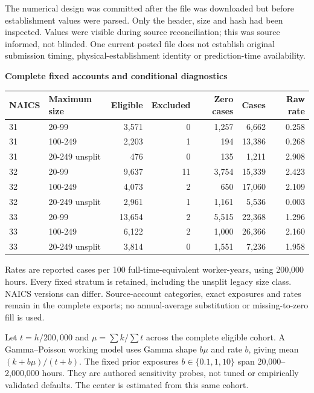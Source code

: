 \documentclass[11pt,letterpaper]{article}
\newcommand{\heading}[1]{\vspace{4pt}{\large\bfseries #1}\par}
\newcommand{\BoundJ}{3,571}
\newcommand{\BoundK}{0}
\newcommand{\BoundL}{1,257}
\newcommand{\BoundM}{6,662}
\newcommand{\BoundN}{0.258}
\newcommand{\BoundO}{2,203}
\newcommand{\BoundP}{1}
\newcommand{\BoundQ}{194}
\newcommand{\BoundR}{13,386}
\newcommand{\BoundS}{0.268}
\newcommand{\BoundT}{476}
\newcommand{\BoundU}{0}
\newcommand{\BoundV}{135}
\newcommand{\BoundW}{1,211}
\newcommand{\BoundX}{2.908}
\newcommand{\BoundY}{9,637}
\newcommand{\BoundZ}{11}
\newcommand{\BoundAA}{3,754}
\newcommand{\BoundAB}{15,339}
\newcommand{\BoundAC}{2.423}
\newcommand{\BoundAD}{4,073}
\newcommand{\BoundAE}{2}
\newcommand{\BoundAF}{650}
\newcommand{\BoundAG}{17,060}
\newcommand{\BoundAH}{2.109}
\newcommand{\BoundAI}{2,961}
\newcommand{\BoundAJ}{1}
\newcommand{\BoundAK}{1,161}
\newcommand{\BoundAL}{5,536}
\newcommand{\BoundAM}{0.003}
\newcommand{\BoundAN}{13,654}
\newcommand{\BoundAO}{2}
\newcommand{\BoundAP}{5,515}
\newcommand{\BoundAQ}{22,368}
\newcommand{\BoundAR}{1.296}
\newcommand{\BoundAS}{6,122}
\newcommand{\BoundAT}{2}
\newcommand{\BoundAU}{1,000}
\newcommand{\BoundAV}{26,366}
\newcommand{\BoundAW}{2.160}
\newcommand{\BoundAX}{3,814}
\newcommand{\BoundAY}{0}
\newcommand{\BoundAZ}{1,551}
\newcommand{\BoundBA}{7,236}
\newcommand{\BoundBB}{1.958}
\begin{document}
The numerical design was committed after the file was downloaded but before establishment values were parsed. Only the header, size and hash had been inspected. Values were visible during source reconciliation; this was source informed, not blinded. One current posted file does not establish original submission timing, physical-establishment identity or prediction-time availability.
\newpage
{\Large\bfseries Complete fixed accounts and conditional diagnostics\par}
{\small\setlength{\tabcolsep}{5pt}
\begin{tabular}{@{}llrrrrr@{}}\toprule
NAICS & Maximum size & Eligible & Excluded & Zero cases & Cases & Raw rate\\\midrule
31 & 20-99 & \BoundJ{} & \BoundK{} & \BoundL{} & \BoundM{} & \BoundN{} \\
31 & 100-249 & \BoundO{} & \BoundP{} & \BoundQ{} & \BoundR{} & \BoundS{} \\
31 & 20-249 unsplit & \BoundT{} & \BoundU{} & \BoundV{} & \BoundW{} & \BoundX{} \\
32 & 20-99 & \BoundY{} & \BoundZ{} & \BoundAA{} & \BoundAB{} & \BoundAC{} \\
32 & 100-249 & \BoundAD{} & \BoundAE{} & \BoundAF{} & \BoundAG{} & \BoundAH{} \\
32 & 20-249 unsplit & \BoundAI{} & \BoundAJ{} & \BoundAK{} & \BoundAL{} & \BoundAM{} \\
33 & 20-99 & \BoundAN{} & \BoundAO{} & \BoundAP{} & \BoundAQ{} & \BoundAR{} \\
33 & 100-249 & \BoundAS{} & \BoundAT{} & \BoundAU{} & \BoundAV{} & \BoundAW{} \\
33 & 20-249 unsplit & \BoundAX{} & \BoundAY{} & \BoundAZ{} & \BoundBA{} & \BoundBB{} \\
\bottomrule\end{tabular}}

Rates are reported cases per 100 full-time-equivalent worker-years, using 200,000 hours. Every fixed stratum is retained, including the unsplit legacy size class. NAICS versions can differ. Source-account categories, exact exposures and rates remain in the complete exports; no annual-average substitution or missing-to-zero fill is used.

\heading{All declared descriptive shrinkage strengths}
Let $t=h/200{,}000$ and $\mu=\sum k/\sum t$ across the complete eligible cohort. A Gamma--Poisson working model uses Gamma shape $b\mu$ and rate $b$, giving mean $(k+b\mu)/(t+b)$. The fixed prior exposures $b\in\{0.1,1,10\}$ span 20,000--2,000,000 hours. They are authored sensitivity probes, not tuned or empirically validated defaults. The center is estimated from this same cohort.
\end{document}
